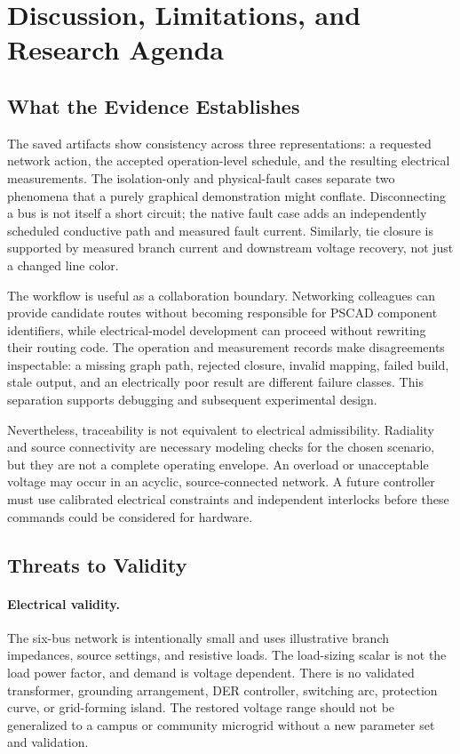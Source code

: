 \section{Discussion, Limitations, and Research Agenda}
\label{sec:discussion}
\subsection{What the Evidence Establishes}
The saved artifacts show consistency across three representations: a requested
network action, the accepted operation-level schedule, and the resulting
electrical measurements. The isolation-only and physical-fault cases separate
two phenomena that a purely graphical demonstration might conflate.
Disconnecting a bus is not itself a short circuit; the native fault case
adds an independently scheduled conductive path and measured fault current.
Similarly, tie closure is supported by measured branch current and downstream
voltage recovery, not just a changed line color.

The workflow is useful as a collaboration boundary. Networking colleagues can
provide candidate routes without becoming responsible for PSCAD component
identifiers, while electrical-model development can proceed without rewriting
their routing code. The operation and measurement records make disagreements
inspectable: a missing graph path, rejected closure, invalid mapping, failed
build, stale output, and an electrically poor result are different failure
classes. This separation supports debugging and subsequent experimental design.

Nevertheless, traceability is not equivalent to electrical admissibility.
Radiality and source connectivity are necessary modeling checks for the chosen
scenario, but they are not a complete operating envelope. An overload or
unacceptable voltage may occur in an acyclic, source-connected network. A
future controller must use calibrated electrical constraints and independent
interlocks before these commands could be considered for hardware.

\subsection{Threats to Validity}
\paragraph{Electrical validity.}
The six-bus network is intentionally small and uses illustrative branch
impedances, source settings, and resistive loads. The load-sizing scalar is
not the load power factor, and demand is voltage dependent. There is no
validated transformer, grounding arrangement, DER controller, switching arc,
protection curve, or grid-forming island. The restored voltage range should
not be generalized to a campus or community microgrid without a new parameter
set and validation.

